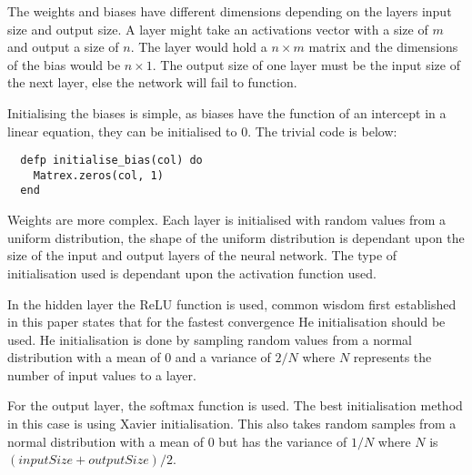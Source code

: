 The weights and biases have different dimensions depending on the layers input size
and output size. A layer might take an activations vector with a size of \(m\) and
output a size of \(n\). The layer would hold a \(n \times m\) matrix
and the dimensions of the bias would be \(n \times 1\). The
output size of one layer must be the input size of the next layer, else the
network will fail to function.

Initialising the biases is simple, as biases have the function of an intercept
in a linear equation, they can be initialised to 0. The trivial code is below:
\begin{lstlisting}
  defp initialise_bias(col) do
    Matrex.zeros(col, 1)
  end
  \end{lstlisting} 

Weights are more complex. Each layer is initialised with random values from a
uniform distribution, the shape of the uniform distribution is dependant upon
the size of the input and output layers of the neural network. The type of
initialisation used is dependant upon the activation function used.

In the hidden layer the ReLU function is used, common wisdom first established
in this paper \cite{he2015delving} states that for the fastest convergence He
initialisation should be used. He initialisation is done by sampling random
values from a normal distribution with a mean of 0 and a variance of \( 2/N \)
where \(N\) represents the number of input values to a layer.

For the output layer, the softmax function is used. The best initialisation
method in this case is using Xavier
initialisation. \cite{glorot2010understanding} This also takes random samples
from a normal distribution with a mean of 0 but has the variance of \( 1/N \)
where \(N\) is \( (inputSize + outputSize) / 2 \).

